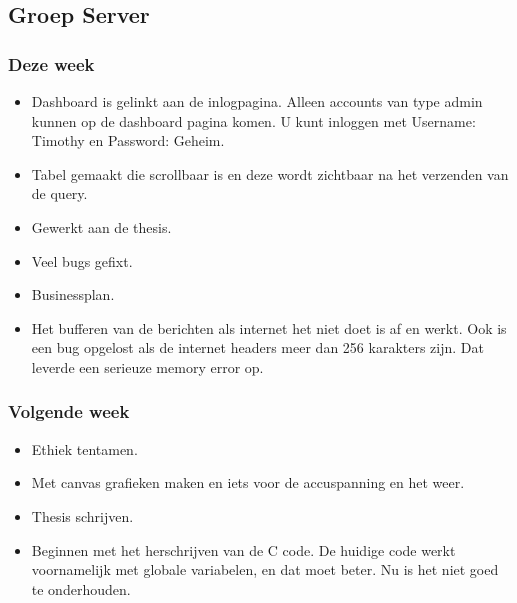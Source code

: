 \subsection*{Groep Server}
\subsubsection*{Deze week}
\begin{itemize}
\item Dashboard is gelinkt aan de inlogpagina. Alleen accounts van type admin kunnen op de dashboard pagina komen. U kunt inloggen met Username: Timothy en Password: Geheim.
\item Tabel gemaakt die scrollbaar is en deze wordt zichtbaar na het verzenden van de query.
\item Gewerkt aan de thesis.
\item Veel bugs gefixt.
\item Businessplan.
\item Het bufferen van de berichten als internet het niet doet is af en werkt. Ook is een bug opgelost als de internet headers meer dan 256 karakters zijn. Dat leverde een serieuze memory error op.
\end{itemize}
\subsubsection*{Volgende week}
\begin{itemize}
\item Ethiek tentamen.
\item Met canvas grafieken maken en iets voor de accuspanning en het weer.
\item Thesis schrijven.
\item Beginnen met het herschrijven van de C code. De huidige code werkt voornamelijk met globale variabelen, en dat moet beter. Nu is het niet goed te onderhouden.
\end{itemize}
